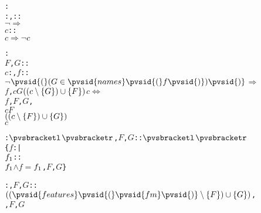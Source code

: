 \begin{alltt}
  : 
     \pvsid{(}: , : \pvsid{)}:
      \pvsid{(}\(\neg\) \pvsid{(}\pvsid{(}\pvsid{)}\pvsid{(}\pvsid{)}\pvsid{)}\pvsid{)} \(\Rightarrow\)
       \pvsid{(} \pvsid{(}\(c\): \pvsid{)}:
           \pvsid{(}\pvsid{)}\pvsid{(}\(c\)\pvsid{)} \(\Rightarrow\) \(\neg\) \(c\)\pvsid{(}\pvsid{)}\pvsid{)}\vspace*{\pvsdeclspacing}

  : 
     \pvsid{(}\(F\), \(G\): \pvsid{)}:
      \pvsid{(} \pvsid{(}\(c\): , \(f\): \pvsid{)}:
          \(\neg\) \(\pvsid{(}\setsothermembertwofn{G}{\pvsid{names}\pvsid{(}f\pvsid{)}}\pvsid{)}\) \(\Rightarrow\)
           \pvsid{(}\pvsid{(}\(f\),  \pvsid{(}\(c\)\pvsid{(}\(G\)\pvsid{)}\pvsid{)}  \(\setsotheraddtwofn{F}{\setsotherremovetwofn{G}{c}}\)  \(c\) \pvsid{)} \(\Leftrightarrow\)
              \pvsid{(}\pvsid{(}\(f\), \(F\), \(G\)\pvsid{)},
                          \pvsid{(}\(c\)\pvsid{(}\(F\)\pvsid{)}\pvsid{)}
                            \(\setsotheraddtwofn{G}{\setsotherremovetwofn{F}{c}}\)
                          \(c\)
                         \pvsid{)}\pvsid{)}\pvsid{)}\vspace*{\pvsdeclspacing}

  \pvsid{(}: \({\pvsbracketl}\)\({\pvsbracketr}\), \(F\), \(G\): \pvsid{)}: \({\pvsbracketl}\)\({\pvsbracketr}\) \pvskey{=}
      \{\(f\):  |
           \pvsid{(}\(f\sb{1}\): \pvsid{)}:
            \pvsid{(}\(f\sb{1}\)\pvsid{)} \(\wedge\) \(f\) \(=\) \pvsid{(}\(f\sb{1}\), \(F\), \(G\)\pvsid{)}\}\vspace*{\pvsdeclspacing}

  \pvsid{(}: , \(F\), \(G\): \pvsid{)}:  \pvskey{=}
      \pvsid{(\#} \pvskey{:=} \(\setsotheraddtwofn{G}{\setsotherremovetwofn{F}{\pvsid{features}\pvsid{(}\pvsid{fm}\pvsid{)}}}\),
         \pvskey{:=} \pvsid{(}\pvsid{(}\pvsid{)}, \(F\), \(G\)\pvsid{)}\pvsid{\#)}\vspace*{\pvsdeclspacing}


\end{alltt}
